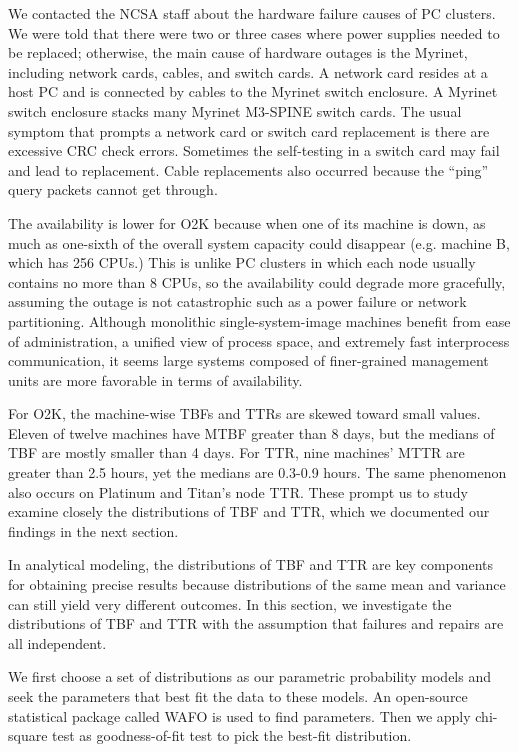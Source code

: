 \documentclass[10pt,twocolumn]{article}
\begin{document}
We contacted the NCSA staff about the hardware failure causes of
PC clusters.
We were told that there were two or three cases where power supplies
needed to be replaced; otherwise, the main cause of hardware
outages is the Myrinet, including network cards, cables, and switch cards.
A network card resides at a host PC and is connected by cables to
the Myrinet switch enclosure. A Myrinet switch enclosure stacks
many Myrinet M3-SPINE switch cards. The usual symptom that prompts a
network card or switch card replacement is there are excessive CRC 
check errors. Sometimes the self-testing in a switch card may fail 
and lead to replacement. Cable replacements also occurred because 
the ``ping'' query packets cannot get through. 

The availability is lower for O2K because when one of its machine 
is down, as much as one-sixth of the overall system capacity could 
disappear (e.g. machine B, which has 256 CPUs.) This is unlike PC 
clusters in which each node usually contains no more than 8 CPUs, 
so the availability could degrade more gracefully, assuming the 
outage is not catastrophic such as a power failure or network 
partitioning. Although monolithic single-system-image machines 
benefit from ease of administration, a unified view of process 
space, and extremely fast interprocess communication, it seems 
large systems composed of finer-grained management units are more 
favorable in terms of availability.

For O2K, the machine-wise TBFs and TTRs are skewed toward small 
values. Eleven of twelve machines have MTBF 
greater than 8 days, but the medians of TBF are mostly smaller than
 4 days. For TTR, nine machines' MTTR are greater than 2.5 hours, yet 
the medians are 0.3-0.9 hours. The same phenomenon also occurs 
on Platinum and Titan's node TTR. These prompt us to study 
examine closely the distributions of TBF and TTR, which we
documented our findings in the next section.

\label{s:dist}
In analytical modeling, the distributions of TBF and TTR
are key components for obtaining precise results \cite{TrivediBook} 
because distributions of the same mean and variance can still 
yield very different outcomes. In this section, we investigate the 
distributions of TBF and TTR with the assumption that 
failures and repairs are all independent.

We first choose a set of distributions as our parametric probability 
models and seek the parameters that best fit the data to 
these models. An open-source statistical package called WAFO 
\cite{WafoPackage} is used to find parameters. Then we apply 
chi-square test as goodness-of-fit test to pick the best-fit 
distribution.
\end{document}
